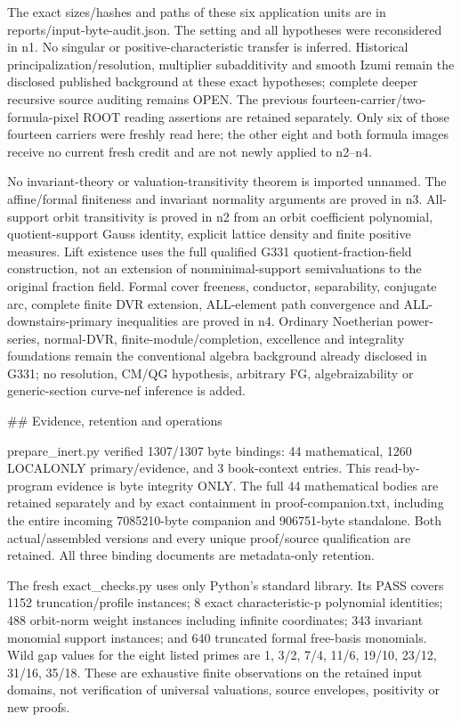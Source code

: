 \documentclass[11pt]{article}
\begin{document}
The exact sizes/hashes and paths of these six application units are in reports/input-byte-audit.json. The setting and all hypotheses were reconsidered in n1. No singular or positive-characteristic transfer is inferred. Historical principalization/resolution, multiplier subadditivity and smooth Izumi remain the disclosed published background at these exact hypotheses; complete deeper recursive source auditing remains OPEN. The previous fourteen-carrier/two-formula-pixel ROOT reading assertions are retained separately. Only six of those fourteen carriers were freshly read here; the other eight and both formula images receive no current fresh credit and are not newly applied to n2--n4.

No invariant-theory or valuation-transitivity theorem is imported unnamed. The affine/formal finiteness and invariant normality arguments are proved in n3. All-support orbit transitivity is proved in n2 from an orbit coefficient polynomial, quotient-support Gauss identity, explicit lattice density and finite positive measures. Lift existence uses the full qualified G331 quotient-fraction-field construction, not an extension of nonminimal-support semivaluations to the original fraction field. Formal cover freeness, conductor, separability, conjugate arc, complete finite DVR extension, ALL-element path convergence and ALL-downstairs-primary inequalities are proved in n4. Ordinary Noetherian power-series, normal-DVR, finite-module/completion, excellence and integrality foundations remain the conventional algebra background already disclosed in G331; no resolution, CM/QG hypothesis, arbitrary FG, algebraizability or generic-section curve-nef inference is added.

\#\# Evidence, retention and operations

prepare\_inert.py verified 1307/1307 byte bindings: 44 mathematical, 1260 LOCALONLY primary/evidence, and 3 book-context entries. This read-by-program evidence is byte integrity ONLY. The full 44 mathematical bodies are retained separately and by exact containment in proof-companion.txt, including the entire incoming 7085210-byte companion and 906751-byte standalone. Both actual/assembled versions and every unique proof/source qualification are retained. All three binding documents are metadata-only retention.

The fresh exact\_checks.py uses only Python's standard library. Its PASS covers 1152 truncation/profile instances; 8 exact characteristic-p polynomial identities; 488 orbit-norm weight instances including infinite coordinates; 343 invariant monomial support instances; and 640 truncated formal free-basis monomials. Wild gap values for the eight listed primes are 1, 3/2, 7/4, 11/6, 19/10, 23/12, 31/16, 35/18. These are exhaustive finite observations on the retained input domains, not verification of universal valuations, source envelopes, positivity or new proofs.
\end{document}
